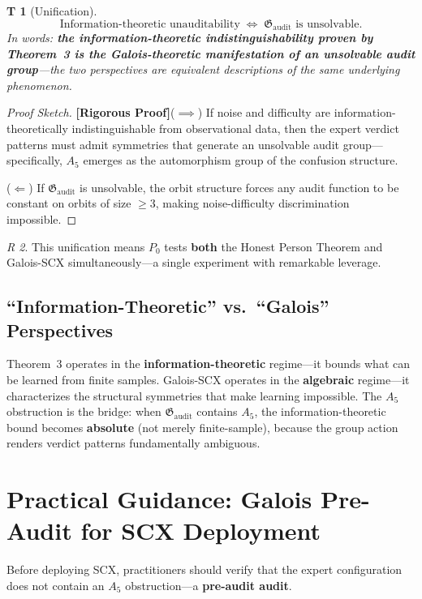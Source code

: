 \documentclass[12pt,a4paper]{article}
\newtheorem{theorem}Theorem[section]
\theoremstyle{remark}
\newtheorem{remark}[theorem]Remark
\newcommand{\AuditGrp}{\mathfrak{G}_{\mathrm{audit}}}
\newcommand{\rigorous}{\textnormal{\textbf{[Rigorous Proof]}}}
\begin{document}
\begin{theorem}[Unification]\label{thm:unification}
\begin{equation}\label{eq:unification}
    \text{Information-theoretic unauditability} \;\Longleftrightarrow\; \AuditGrp \text{ is unsolvable}.
\end{equation}
In words: \textbf{the information-theoretic indistinguishability proven by Theorem~3 is the Galois-theoretic manifestation of an unsolvable audit group}---the two perspectives are equivalent descriptions of the same underlying phenomenon.
\end{theorem}
\begin{proof}[Proof Sketch]
\rigorous (\(\implies\)) If noise and difficulty are information-theoretically indistinguishable from observational data, then the expert verdict patterns must admit symmetries that generate an unsolvable audit group---specifically, \(A_5\) emerges as the automorphism group of the confusion structure.

(\(\Longleftarrow\)) If \(\AuditGrp\) is unsolvable, the orbit structure forces any audit function to be constant on orbits of size \(\geq 3\), making noise-difficulty discrimination impossible.
\end{proof}

\begin{remark}
This unification means \(P_0\) tests \textbf{both} the Honest Person Theorem and Galois-SCX simultaneously---a single experiment with remarkable leverage.
\end{remark}

\subsection{``Information-Theoretic'' vs.\ ``Galois'' Perspectives}
Theorem~3 operates in the \textbf{information-theoretic} regime---it bounds what can be learned from finite samples. Galois-SCX operates in the \textbf{algebraic} regime---it characterizes the structural symmetries that make learning impossible. The \(A_5\) obstruction is the bridge: when \(\AuditGrp\) contains \(A_5\), the information-theoretic bound becomes \textbf{absolute} (not merely finite-sample), because the group action renders verdict patterns fundamentally ambiguous.
\section{Practical Guidance: Galois Pre-Audit for SCX Deployment}
Before deploying SCX, practitioners should verify that the expert configuration does not contain an \(A_5\) obstruction---a \textbf{pre-audit audit}.
\end{document}
